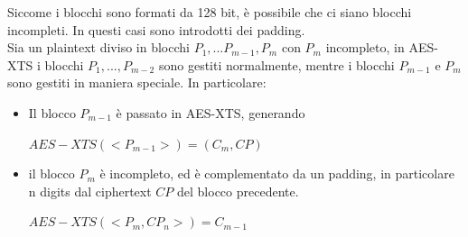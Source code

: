 \documentclass[11pt, oneside]{article}   	%
\begin{document}
Siccome i blocchi sono formati da 128 bit, è possibile che ci siano blocchi incompleti. In questi casi sono introdotti dei padding. \\Sia un plaintext diviso in blocchi $P_1, ... P_{m-1}, P_m$ con $P_m$ incompleto, in AES-XTS i blocchi  $P_1, ..., P_{m-2}$ sono gestiti normalmente, mentre i blocchi $P_{m-1}$ e $P_m$ sono gestiti in maniera speciale. In particolare:
\begin{itemize}
\item Il blocco $P_{m-1}$ è passato in AES-XTS, generando 
\begin{center}
$AES-XTS(<P_{m-1}>) = (C_{m}, CP)$
\end{center}
\item il blocco $P_{m}$ è incompleto, ed è complementato da un padding, in particolare n digits dal ciphertext $CP$ del blocco precedente.
\begin{center}
$AES-XTS(<P_m, CP_n>) = C_{m-1}$
\end{center}\end{itemize}
\end{document}

